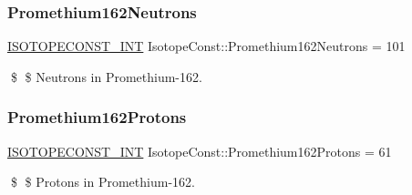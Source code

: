 \subsubsection{\texorpdfstring{Promethium162\+Neutrons}{Promethium162Neutrons}}
{\footnotesize\ttfamily \mbox{\hyperlink{group___isotope_const-_macros_ga5f18360b3e99483a35c32d789e62621c}{I\+S\+O\+T\+O\+P\+E\+C\+O\+N\+S\+T\+\_\+\+I\+NT}} Isotope\+Const\+::\+Promethium162\+Neutrons = 101}

\$ \$ Neutrons in Promethium-\/162. \mbox{\label{group___isotope_const-_promethium-_pm162_ga17e4b0c58109314fa5bb46483b16d003}} 
\subsubsection{\texorpdfstring{Promethium162\+Protons}{Promethium162Protons}}
{\footnotesize\ttfamily \mbox{\hyperlink{group___isotope_const-_macros_ga5f18360b3e99483a35c32d789e62621c}{I\+S\+O\+T\+O\+P\+E\+C\+O\+N\+S\+T\+\_\+\+I\+NT}} Isotope\+Const\+::\+Promethium162\+Protons = 61}

\$ \$ Protons in Promethium-\/162. 